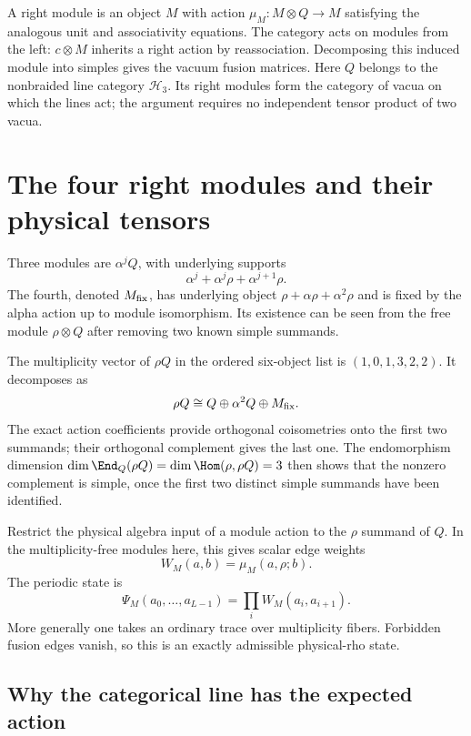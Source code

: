 A right module is an object $M$ with action
$\mu_M:M\otimes Q\to M$ satisfying the analogous unit and
associativity equations. The category acts on modules from the left:
$c\otimes M$ inherits a right action by reassociation. Decomposing
this induced module into simples gives the vacuum fusion matrices.
Here $Q$ belongs to the nonbraided line category $\mathcal H_3$.
Its right modules form the category of vacua on which the lines act;
the argument requires no independent tensor product of two vacua.

\section{The four right modules and their physical tensors}

Three modules are $\alpha^jQ$, with underlying supports
\[
 \alpha^j+\alpha^j\rho+\alpha^{j+1}\rho.
\]
The fourth, denoted $M_{\rm fix}$, has underlying object
$\rho+\alpha\rho+\alpha^2\rho$ and is fixed by the alpha action
up to module isomorphism. Its existence can be seen from the free
module $\rho\otimes Q$ after removing two known simple summands.

The multiplicity vector of $\rho Q$ in the ordered six-object list
is $(1,0,1,3,2,2)$. It decomposes as
\[
 \rho Q\cong Q\oplus\alpha^2Q\oplus M_{\rm fix}.
\]
The exact action coefficients provide orthogonal coisometries onto
the first two summands; their orthogonal complement gives the last
one. The endomorphism dimension
$\dim\End_Q(\rho Q)=\dim\Hom(\rho,\rho Q)=3$ then shows that the
nonzero complement is simple, once the first two distinct simple
summands have been identified.

Restrict the physical algebra input of a module action to the
$\rho$ summand of $Q$. In the multiplicity-free modules here, this
gives scalar edge weights
\[
 W_M(a,b)=\mu_M(a,\rho;b).
\]
The periodic state is
\begin{equation}
 \Psi_M(a_0,\ldots,a_{L-1})
 =\prod_iW_M(a_i,a_{i+1}).
 \label{eq:module-edge-state}
\end{equation}
More generally one takes an ordinary trace over multiplicity fibers.
Forbidden fusion edges vanish, so this is an exactly admissible
physical-rho state.

\subsection{Why the categorical line has the expected action}

